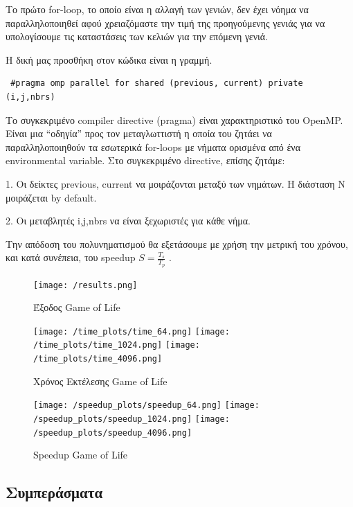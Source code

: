 \documentclass[letterpaper,12pt]{article}
\begin{document}
Το πρώτο for-loop, το οποίο είναι η αλλαγή των γενιών, δεν έχει νόημα να παραλληλοποιηθεί αφού χρειαζόμαστε την τιμή της προηγούμενης γενιάς για να υπολογίσουμε τις καταστάσεις των κελιών για την επόμενη γενιά.


Η δική μας προσθήκη στον κώδικα είναι η γραμμή.

\begin{lstlisting}
 #pragma omp parallel for shared (previous, current) private (i,j,nbrs)
\end{lstlisting}


Το συγκεκριμένο compiler directive (pragma) είναι χαρακτηριστικό του OpenMP. Είναι μια “οδηγία” προς τον μεταγλωττιστή η οποία του ζητάει να παραλληλοποιηθούν τα εσωτερικά for-loops με νήματα ορισμένα από ένα environmental variable. Στο συγκεκριμένο directive, επίσης ζητάμε:

1.	Οι δείκτες previous, current να μοιράζονται μεταξύ των νημάτων. Η διάσταση Ν μοιράζεται by default.

2.	Οι μεταβλητές i,j,nbrs να είναι ξεχωριστές για κάθε νήμα.
\newline

Την απόδοση του πολυνηματισμού θα εξετάσουμε με χρήση την μετρική του χρόνου, και κατά συνέπεια, του speedup $S=\frac{T_s}{T_p}$ . \newline

\begin{figure}[H]
    \centering
    \texttt{[image: /results.png]}
    \caption{Έξοδος Game of Life}
    \label{fig:Έξοδος Game Of Life}
\end{figure}

\begin{figure}[H]
    \centering
    \texttt{[image: /time\_plots/time\_64.png]}
    \texttt{[image: /time\_plots/time\_1024.png]}
    \texttt{[image: /time\_plots/time\_4096.png]}
    \caption{Χρόνος Εκτέλεσης Game of Life}
    \label{fig:Χρόνος Εκτέλεσης Game Of Life}
\end{figure}

\begin{figure}[H]
    \centering
    \texttt{[image: /speedup\_plots/speedup\_64.png]}
    \texttt{[image: /speedup\_plots/speedup\_1024.png]}
    \texttt{[image: /speedup\_plots/speedup\_4096.png]}
    \caption{Speedup Game of Life}
    \label{fig:Speedup Game Of Life}
\end{figure}

\subsection*{Συμπεράσματα}
\end{document}
